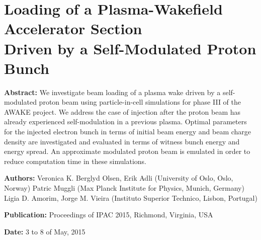 %
%

\chapter{Loading of a Plasma-Wakefield Accelerator Section\\
         Driven by a Self-Modulated Proton Bunch}
\label{Pub:IPAC15}

\begin{hangparas}{10mm}{1}

    \textbf{Abstract:}
    We investigate beam loading of a plasma wake driven by a self-modulated proton beam using particle-in-cell
    simulations for phase III of the AWAKE project. We address the case of injection after the proton beam has already
    experienced self-modulation in a previous plasma. Optimal parameters for the injected electron bunch in terms of
    initial beam energy and beam charge density are investigated and evaluated in terms of witness bunch energy and
    energy spread. An approximate modulated proton beam is emulated in order to reduce computation time in these
    simulations.

    \vspace{8mm}

    \textbf{Authors:}
    Veronica K. Berglyd Olsen, Erik Adli (University of Oslo, Oslo, Norway)
    Patric Muggli (Max Planck Institute for Physics, Munich, Germany)
    Ligia D. Amorim, Jorge M. Vieira (Instituto Superior Technico, Lisbon, Portugal)

    \vspace{5mm}

    \textbf{Publication:}
    Proceedings of IPAC 2015, Richmond, Virginia, USA

    \vspace{5mm}

    \textbf{Date:} 3 to 8 of May, 2015

\end{hangparas}

